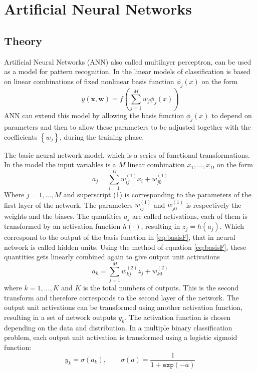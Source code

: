 \chapter{Artificial Neural Networks}

\section{Theory}
Artificial Neural Networks (ANN) also called multilayer perceptron, can be used as a model for pattern recognition. 
In the linear models of classification is based on linear combinations of fixed nonlinear basis function $ \phi_j(x)$ on the form
\begin{equation}
y(\mathbf{x},\mathbf{w}) = f\left( \sum_{j=1}^{M}w_j \phi_j(x) \right)
\label{eq:basisF} 
\end{equation}
ANN can extend this model by allowing the basis function $ \phi_j(x)$ to depend on parameters and then to allow these parameters to be adjusted together with the coefficients $ \left\lbrace w_j \right\rbrace $, during the training phase.

The basic neural network model, which is a series of functional transformations. 
In the model the input variables is a $ M $ linear combination $ x_1,...,x_D $ on the form
\begin{equation}
a_j = \sum_{i=1}^{D} w_{ij}^{(1)}x_i+w_{j0}^{(1)}
\end{equation}
Where $ j=1,...,M $ and superscript (1) is corresponding to the parameters of the first layer of the network.
The parameters $ w_{ij}^{(1)}$ and $w_{j0}^{(1)} $ is respectively the weights and the biases. 
The quantities $ a_j $ are called activations, each of them is transformed by an activation function $ h(\cdotp) $, resulting in $ z_j = h(a_j) $.
Which correspond to the output of the basis function in \ref{eq:basisF}, that in neural network is called hidden units. Using the method of equation \ref{eq:basisF}, these quantities gets linearly combined again to give output unit activations  
\begin{equation}
a_k = \sum_{j=1}^{M} w_{kj}^{(2)}z_j+w_{k0}^{(2)}
\end{equation}
where $ k = 1,...,K $ and $ K $ is the total numbers of outputs. 
This is the second transform and therefore corresponds to the second layer of the network.
The output unit activations can be transformed using another activation function, resulting in a set of network outputs $ y_k $.
The activation function is chosen depending on the data and distribution.
In a multiple binary classification problem, each output unit activation is transformed using a logistic sigmoid function:
\begin{equation}
y_k = \sigma(a_k), \qquad \sigma(a) = \dfrac{1}{1+\mathtt{exp}(-a)}
\end{equation}
   
